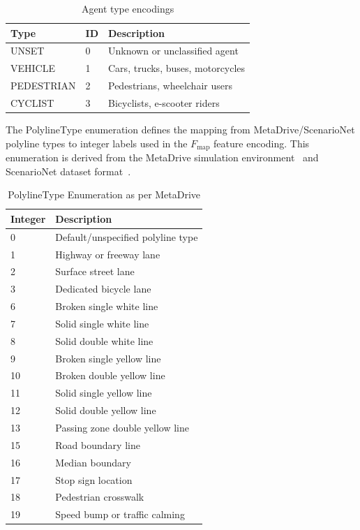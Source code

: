 \begin{table}[H]
    \caption{Agent type encodings}
    \label{tab:agent_types}
\centering
\begin{tabular}{p{3cm}p{2cm}p{8cm}}
\toprule
\textbf{Type} & \textbf{ID} & \textbf{Description} \\
\midrule
UNSET & 0 & Unknown or unclassified agent \\
VEHICLE & 1 & Cars, trucks, buses, motorcycles \\
PEDESTRIAN & 2 & Pedestrians, wheelchair users \\
CYCLIST & 3 & Bicyclists, e-scooter riders \\
\bottomrule
\end{tabular}
\end{table}

The PolylineType enumeration defines the mapping from MetaDrive/ScenarioNet polyline types to integer labels used in the \(F_{\text{map}}\) feature encoding. This enumeration is derived from the MetaDrive simulation environment~\cite{metadriveLi2022} and ScenarioNet dataset format~\cite{scenarionetLi2023}.

\begin{table}[H]
\centering
\caption{PolylineType Enumeration as per MetaDrive}
\label{tab:polyline-types}
\begin{tabular}{p{2cm}p{11cm}}
\toprule
\textbf{Integer} & \textbf{Description} \\
\midrule
0 & Default/unspecified polyline type \\
1 & Highway or freeway lane \\
2 & Surface street lane \\
3 & Dedicated bicycle lane \\
6 & Broken single white line \\
7 & Solid single white line \\
8 & Solid double white line \\
9 & Broken single yellow line \\
10 & Broken double yellow line \\
11 & Solid single yellow line \\
12 & Solid double yellow line \\
13 & Passing zone double yellow line \\
15 & Road boundary line \\
16 & Median boundary \\
17 & Stop sign location \\
18 & Pedestrian crosswalk \\
19 & Speed bump or traffic calming \\
\bottomrule
\end{tabular}
\end{table}

